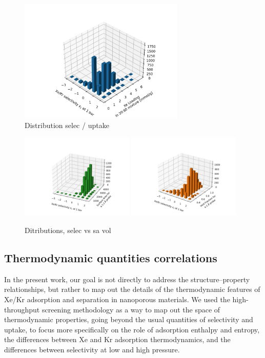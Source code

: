 \documentclass[main.tex]{subfiles}
\begin{document}
\begin{figure}[ht]
  \centering
  \includegraphics[width=0.7\textwidth]{figures/2-thermo/3D_hist_selec_uptake.jpg}
  \caption{Distribution selec / uptake}
\end{figure}

\begin{figure}[ht]
  \centering
  \includegraphics[width=0.48\textwidth]{figures/2-thermo/3D_hist_selec_SA.jpg}
  \includegraphics[width=0.48\textwidth]{figures/2-thermo/3D_hist_selec_vol.jpg}
  \caption{Ditributions, selec vs sa vol}
\end{figure}

\subsection{Thermodynamic quantities correlations}

In the present work, our goal is not directly to address the structure--property relationships, but rather to map out the details of the thermodynamic features of Xe/Kr adsorption and separation in nanoporous materials. We used the high-throughput screening methodology as a way to map out the space of thermodynamic properties, going beyond the usual quantities of selectivity and uptake, to focus more specifically on the role of adsorption enthalpy and entropy, the differences between Xe and Kr adsorption thermodynamics, and the differences between selectivity at low and high pressure.
\end{document}

